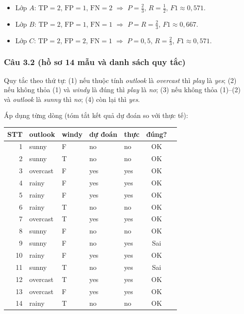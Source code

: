 \begin{itemize}
  \item Lớp $A$: $\mathrm{TP}=2$, $\mathrm{FP}=1$, $\mathrm{FN}=2$ $\Rightarrow$ $P=\frac{2}{3}$, $R=\frac{1}{2}$, $F1\approx0{,}571$.
  \item Lớp $B$: $\mathrm{TP}=2$, $\mathrm{FP}=1$, $\mathrm{FN}=1$ $\Rightarrow$ $P=R=\frac{2}{3}$, $F1\approx0{,}667$.
  \item Lớp $C$: $\mathrm{TP}=2$, $\mathrm{FP}=2$, $\mathrm{FN}=1$ $\Rightarrow$ $P=0{,}5$, $R=\frac{2}{3}$, $F1\approx0{,}571$.
\end{itemize}

\subsubsection*{Câu 3.2 (hồ sơ 14 mẫu và danh sách quy tắc)}

Quy tắc theo thứ tự: (1) nếu thuộc tính \emph{outlook} là \emph{overcast} thì \emph{play} là \emph{yes}; (2) nếu không thỏa (1) và \emph{windy} là đúng thì \emph{play} là \emph{no}; (3) nếu không thỏa (1)--(2) và \emph{outlook} là \emph{sunny} thì \emph{no}; (4) còn lại thì \emph{yes}.

Áp dụng từng dòng (tóm tắt kết quả dự đoán so với thực tế):

\begin{center}
\small
\begin{tabular}{rllllcc}
STT & outlook & windy & dự đoán & thực & đúng?\\\hline
1 & sunny & F & no & no & OK \\
2 & sunny & T & no & no & OK \\
3 & overcast & F & yes & yes & OK \\
4 & rainy & F & yes & yes & OK \\
5 & rainy & F & yes & yes & OK \\
6 & rainy & T & no & no & OK \\
7 & overcast & T & yes & yes & OK \\
8 & sunny & F & no & no & OK \\
9 & sunny & F & no & yes & Sai \\
10 & rainy & F & yes & yes & OK \\
11 & sunny & T & no & yes & Sai \\
12 & overcast & T & yes & yes & OK \\
13 & overcast & F & yes & yes & OK \\
14 & rainy & T & no & no & OK \\
\end{tabular}
\end{center}

